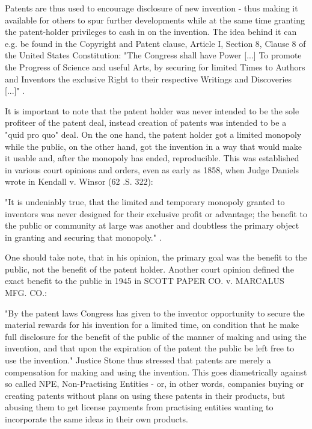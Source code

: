 \documentclass[a4paper]{report}
\begin{document}
Patents are thus used to encourage disclosure of new invention - thus making it available for others to spur further developments while at the same time granting the patent-holder privileges to cash in on the invention. The idea behind it can e.g. be found in the Copyright and Patent clause, Article I, Section 8, Clause 8 of the United States Constitution: "The Congress shall have Power [...] To promote the Progress of Science and useful Arts, by securing for limited Times to Authors and Inventors the exclusive Right to their respective Writings and Discoveries [...]" \parencite{Washington1787}.

It is important to note that the patent holder was never intended to be the sole profiteer of the patent deal, instead creation of patents was intended to be a "quid pro quo" deal. On the one hand, the patent holder got a limited monopoly while the public, on the other hand, got the invention in a way that would make it usable and, after the monopoly has ended, reproducible. This was established in various court opinions and orders, even as early as 1858, when Judge Daniels wrote in Kendall v. Winsor (62 .S. 322): 

"It is undeniably true, that the limited and temporary monopoly granted to inventors was never designed for their exclusive profit or advantage; the benefit to the public or community at large was another and doubtless the primary object in granting and securing that monopoly." \parencite{Curtis1858}.

One should take note, that in his opinion, the primary goal was the benefit to the public, not the benefit of the patent holder. Another court opinion defined the exact benefit to the public in 1945 in SCOTT PAPER CO. v. MARCALUS MFG. CO.:

"By the patent laws Congress has given to the inventor opportunity to secure the material rewards for his invention for a limited time, on condition that he make full disclosure for the benefit of the public of the manner of making and using the invention, and that upon the expiration of the patent the public be left free to use the invention." \parencite{Stone1945} Justice Stone thus stressed that patents are merely a compensation for making and using the invention. This goes diametrically against so called NPE, Non-Practising Entities - or, in other words, companies buying or creating patents without plans on using these patents in their products, but abusing them to get license payments from practising entities wanting to incorporate the same ideas in their own products.
\end{document}
